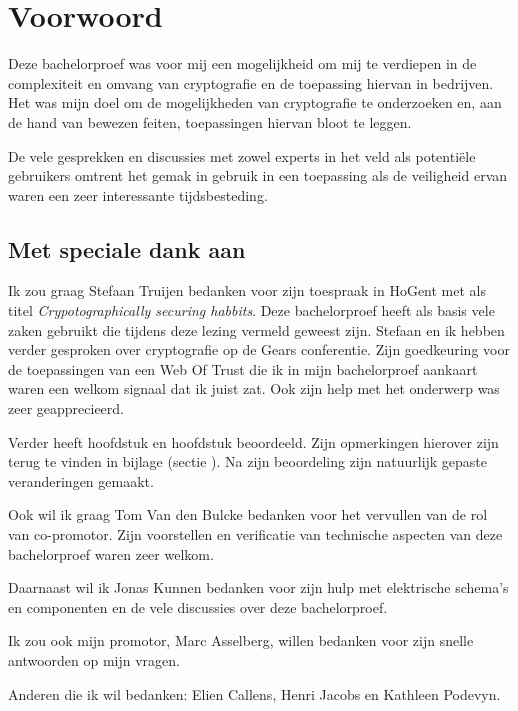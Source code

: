 
\chapter*{Voorwoord}
\label{ch:voorwoord}


Deze bachelorproef was voor mij een mogelijkheid om mij te verdiepen in de
complexiteit en omvang van cryptografie en de toepassing hiervan in bedrijven.
Het was mijn doel om de mogelijkheden van cryptografie te onderzoeken en, aan de
hand van bewezen feiten, toepassingen hiervan bloot te leggen.

De vele gesprekken en discussies met zowel experts in het veld als potentiële
gebruikers omtrent het gemak in gebruik in een toepassing als de veiligheid
ervan waren een zeer interessante tijdsbesteding.

\section*{Met speciale dank aan}
Ik zou graag Stefaan Truijen bedanken voor zijn toespraak in HoGent met als
titel \textit{Crypotographically securing habbits}. Deze bachelorproef heeft als
basis vele zaken gebruikt die tijdens deze lezing vermeld geweest zijn. Stefaan
en ik hebben verder gesproken over cryptografie op de Gears conferentie. Zijn
goedkeuring voor de toepassingen van een Web Of Trust die ik in mijn
bachelorproef aankaart waren een welkom signaal dat ik juist zat. Ook zijn help
met het onderwerp \textit{}  was
zeer geapprecieerd.

Verder heeft \textcite{TruijenStefaan} hoofdstuk
 en hoofdstuk
 beoordeeld. Zijn opmerkingen
hierover zijn terug te vinden in bijlage (sectie
). Na zijn beoordeling zijn
natuurlijk gepaste veranderingen gemaakt.

Ook wil ik graag Tom Van den Bulcke bedanken voor het vervullen van de rol van co-promotor. Zijn voorstellen en verificatie van technische aspecten van deze bachelorproef waren zeer welkom.

Daarnaast wil ik Jonas Kunnen bedanken voor zijn hulp met elektrische schema's en componenten en de vele discussies over deze bachelorproef.

Ik zou ook mijn promotor, Marc Asselberg, willen bedanken voor zijn snelle antwoorden op mijn vragen.

Anderen die ik wil bedanken: Elien Callens, Henri Jacobs en Kathleen Podevyn.
